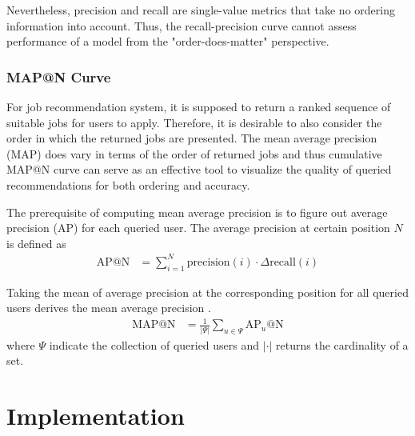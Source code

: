 \documentclass{article} %
\begin{document}
Nevertheless, precision and recall are single-value metrics that take no ordering information
into account. Thus, the recall-precision curve cannot assess performance of a
model from the "order-does-matter" perspective.
\subsubsection{MAP@N Curve}
For job recommendation system, it is supposed to return a ranked sequence of
suitable jobs for users to apply. Therefore, it is desirable to also consider the
order in which the returned jobs are presented. The mean average precision
(MAP) does vary in terms of the order of returned jobs and thus cumulative
MAP@N curve can serve as an effective tool to visualize the quality of queried
recommendations for both ordering and accuracy.

The prerequisite of computing mean average precision is to figure out average
precision (AP) for each queried user. The average precision at certain
position $N$ is defined as
\begin{align}
    \text{AP@N} &= \sum_{i=1}^N \text{precision}(i) \cdot \Delta \text{recall} (i)
\end{align}

Taking the mean of average precision at the corresponding position for all
queried users derives the mean average precision .
\begin{align}
    \text{MAP@N} &= \frac{1}{| \Psi |} \sum_{u \in \Psi}
    \text{AP}_u\text{@N}
\end{align}
where $\Psi$ indicate the collection of queried users and $|\cdot|$ returns
the cardinality of a set.


\section{Implementation}
\end{document}
